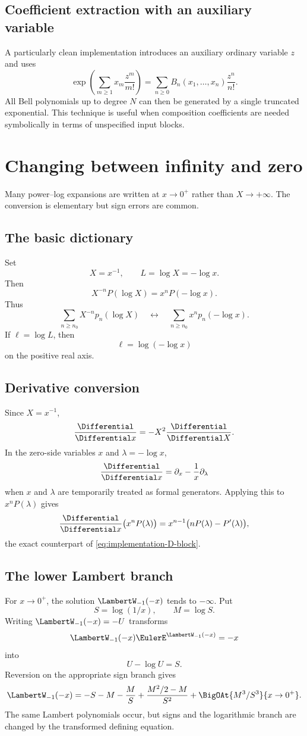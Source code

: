 \documentclass[11pt,oneside]{book}
\theoremstyle{definition}
\theoremstyle{remark}
\begin{document}
\section{Coefficient extraction with an auxiliary variable}
A particularly clean implementation introduces an auxiliary ordinary
variable $z$ and uses
\[
 \exp\!\left(\sum_{m\ge1}x_m\frac{z^m}{m!}\right)
 =\sum_{n\ge0}B_n(x_1,\ldots,x_n)\frac{z^n}{n!}.
\]
All Bell polynomials up to degree $N$ can then be generated by a single
truncated exponential. This technique is useful when composition
coefficients are needed symbolically in terms of unspecified input blocks.

\chapter{Changing between infinity and zero}
\label{app:zero-infinity}

Many power--log expansions are written at $x\to0^+$ rather than
$X\to+\infty$. The conversion is elementary but sign errors are common.

\section{The basic dictionary}
Set
\[
 X=x^{-1},\qquad L=\log X=-\log x.
\]
Then
\begin{equation}\label{eq:zero-infinity-dictionary}
 X^{-n}P(\log X)
 =x^nP(-\log x).
\end{equation}
Thus
\[
 \sum_{n\ge n_0}X^{-n}p_n(\log X)
 \quad\longleftrightarrow\quad
 \sum_{n\ge n_0}x^np_n(-\log x).
\]
If $\ell=\log L$, then
\[
 \ell=\log(-\log x)
\]
on the positive real axis.

\section{Derivative conversion}
Since $X=x^{-1}$,
\[
 \frac{\Differential}{\Differential x}=-X^2\frac{\Differential}{\Differential X}.
\]
In the zero-side variables $x$ and $\lambda=-\log x$,
\[
 \frac{\Differential}{\Differential x}
 =\partial_x-\frac1x\partial_\lambda
\]
when $x$ and $\lambda$ are temporarily treated as formal generators.
Applying this to $x^nP(\lambda)$ gives
\[
 \frac{\Differential}{\Differential x}\bigl(x^nP(\lambda)\bigr)
 =x^{n-1}\bigl(nP(\lambda)-P'(\lambda)\bigr),
\]
the exact counterpart of \eqref{eq:implementation-D-block}.

\section{The lower Lambert branch}
For $x\to0^+$, the solution $\LambertW_{-1}(-x)$ tends to $-\infty$. Put
\[
 S=\log(1/x),\qquad M=\log S.
\]
Writing $\LambertW_{-1}(-x)=-U$ transforms
\[
 \LambertW_{-1}(-x)\EulerE^{\LambertW_{-1}(-x)}=-x
\]
into
\[
 U-\log U=S.
\]
Reversion on the appropriate sign branch gives
\[
 \LambertW_{-1}(-x)
 =-S-M-\frac{M}{S}
 +\frac{M^2/2-M}{S^2}
 +\BigOAt{M^3/S^3}{x\to0^+}.
\]
The same Lambert polynomials occur, but signs and the logarithmic branch are
changed by the transformed defining equation.
\end{document}
